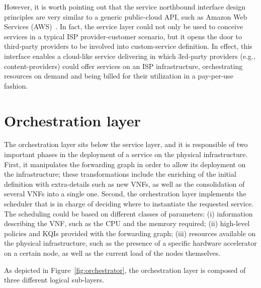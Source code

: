 However, it is worth pointing out that the service northbound interface design principles are very similar to a generic public-cloud API, such as Amazon Web Services (AWS)~\cite{aws}. 
In fact, the service layer could not only be used to conceive services in a typical ISP provider-customer scenario, but it opens the door to third-party providers to be involved into custom-service definition. 
In effect, this interface enables a cloud-like service delivering in which 3rd-party providers (e.g., content-providers) could offer services on an ISP infrastructure, orchestrating resources on demand and being billed for their utilization in a pay-per-use fashion. 


\section{Orchestration layer}
\label{sec:general_orch}
The orchestration layer sits below the service layer, and it is responsible of two important phases in the deployment of a service on the physical infrastructure.
First, it manipulates the forwarding graph in order to allow its deployment on the infrastructure; these transformations include the enriching of the initial definition with extra-details such as new VNFs, as well as the consolidation of several VNFs into a single one. Second, the orchestration layer implements the scheduler that is in charge of deciding where to instantiate the requested service. The scheduling could be based on different classes of parameters: (i) information describing the VNF, such as the CPU and the memrory required; (ii) high-level policies and KQIs provided with the forwarding graph; (iii) resources available on the physical infrastructure, such as the presence of a specific hardware accelerator on a certain node, as well as the current load of the nodes themselves.

As depicted in Figure~\ref{fig:orchestrator}, the orchestration layer is composed of three different logical sub-layers. 

